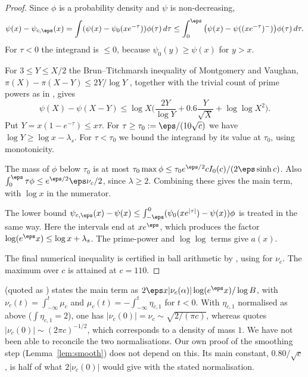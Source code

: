 \begin{proof}
Since $\phi$ is a probability density and $\psi$ is non-decreasing,
\[
\psi(x) - \psi_{c,\eps}(x) = \int (\psi(x) - \psi_0(xe^{-\tau}))\phi(\tau)\,d\tau \le \int_0^{\eps}\big(\psi(x) - \psi((xe^{-\tau})^-)\big)\phi(\tau)\,d\tau .
\]
For $\tau < 0$ the integrand is $\le 0$, because $\psi_0(y) \ge \psi(x)$ for $y > x$.

For $3 \le Y \le X/2$ the Brun--Titchmarsh inequality of Montgomery and Vaughan, $\pi(X)-\pi(X-Y) \le 2Y/\log Y$ \cite{MV73}, together with the trivial count of prime powers as in \cite[(3.9)]{Buthe2018}, gives
\[
\psi(X) - \psi(X - Y) \le \log X\Big(\frac{2Y}{\log Y} + 0.6\frac{Y}{\sqrt X} + \log\log X^2\Big).
\]
Put $Y = x(1-e^{-\tau}) \le x\tau$.
For $\tau \ge \tau_0 := \eps/(10\sqrt c)$ we have $\log Y \ge \log x - \lambda_s$.
For $\tau < \tau_0$ we bound the integrand by its value at $\tau_0$, using monotonicity.

The mass of $\phi$ below $\tau_0$ is at most $\tau_0\max\phi \le \tau_0 e^{\eps/2}c I_0(c)/(2\eps\sinh c)$.
Also $\int_0^\eps\tau\phi \le e^{\eps/2}\eps\nu_c/2$, since $\lambda \ge 2$.
Combining these gives the main term, with $\log x$ in the numerator.

The lower bound $\psi_{c,\eps}(x) - \psi(x) \le \int_{-\eps}^0 (\psi_0(xe^{|\tau|}) - \psi(x))\phi$ is treated in the same way.
Here the intervals end at $xe^{\eps}$, which produces the factor $\log(e^\eps x) \le \log x + \lambda_s$.
The prime-power and $\log\log$ terms give $a(x)$.

The final numerical inequality is certified in ball arithmetic by , using  for $\nu_c$.
The maximum over $c$ is attained at $c = 110$.
\end{proof}

\begin{remark}\label{rem:buthe}
\cite[Prop.~4]{Buthe2016} (quoted as \cite[Prop.~1]{Buthe2018}) states the main term as $2\eps x|\nu_c(\alpha)|\log(e^\eps x)/\log B$, with $\nu_c(t) = \int_{-\infty}^t\mu_c$ and $\mu_c(t) = -\int_{-\infty}^t\eta_{c,1}$ for $t<0$.
With $\eta_{c,1}$ normalised as above ($\int\eta_{c,1} = 2$), one has $|\nu_c(0)| = \nu_c \sim \sqrt{2/(\pi c)}$, whereas \cite[Remark~1]{Buthe2018} quotes $|\nu_c(0)|\sim(2\pi c)^{-1/2}$, which corresponds to a density of mass $1$.
We have not been able to reconcile the two normalisations.
Our own proof of the smoothing step (Lemma~\ref{lem:smooth}) does not depend on this.
Its main constant, $0.80/\sqrt c$, is half of what $2|\nu_c(0)|$ would give with the stated normalisation.
\end{remark}

